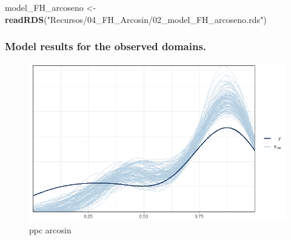 \documentclass[
  12pt,
]{book}
\newenvironment{Shaded}{\begin{snugshade}}{\end{snugshade}}
\newcommand{\AttributeTok}[1]{\textcolor[rgb]{0.13,0.29,0.53}{#1}}
\newcommand{\DecValTok}[1]{\textcolor[rgb]{0.00,0.00,0.81}{#1}}
\newcommand{\FunctionTok}[1]{\textcolor[rgb]{0.13,0.29,0.53}{\textbf{#1}}}
\newcommand{\NormalTok}[1]{#1}
\newcommand{\OtherTok}[1]{\textcolor[rgb]{0.56,0.35,0.01}{#1}}
\newcommand{\SpecialCharTok}[1]{\textcolor[rgb]{0.81,0.36,0.00}{\textbf{#1}}}
\newcommand{\StringTok}[1]{\textcolor[rgb]{0.31,0.60,0.02}{#1}}
\begin{document}
\begin{Shaded}
\begin{Highlighting}[]
\NormalTok{model\_FH\_arcoseno }\OtherTok{\textless{}{-}} \FunctionTok{readRDS}\NormalTok{(}\StringTok{"Recursos/04\_FH\_Arcosin/02\_model\_FH\_arcoseno.rds"}\NormalTok{)}
\end{Highlighting}
\end{Shaded}

\hypertarget{model-results-for-the-observed-domains.}{%
\subsubsection{Model results for the observed domains.}\label{model-results-for-the-observed-domains.}}

\begin{Shaded}
\end{Shaded}

\begin{figure}
\centering
\includegraphics{Recursos/04_FH_Arcosin/03_ppc_Arcosin.png}
\caption{ppc arcosin}
\end{figure}
\end{document}
